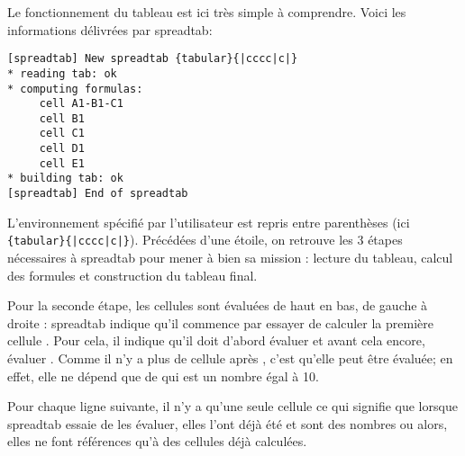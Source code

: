\documentclass[a4paper,10pt]{article}
\newcommand\verbinline[1][]{\lstinline[breaklines=false,basicstyle=\normalsize\ttfamily,#1]}
\newcommand\ST{\textsf{spreadtab}\xspace}
\newcommand\falseverb[1]{\texttt{\detokenize{#1}}}
\begin{document}
Le fonctionnement du tableau est ici très simple à comprendre. Voici les informations délivrées par \ST :\par\nobreak
\begin{lstlisting}
[spreadtab] New spreadtab {tabular}{|cccc|c|}
* reading tab: ok
* computing formulas:
     cell A1-B1-C1
     cell B1
     cell C1
     cell D1
     cell E1
* building tab: ok
[spreadtab] End of spreadtab
\end{lstlisting}
L'environnement spécifié par l'utilisateur est repris entre parenthèses (ici \verbinline-{tabular}{|cccc|c|}-). Précédées d'une étoile, on retrouve les 3 étapes nécessaires à \ST pour mener à bien sa mission : lecture du tableau, calcul des formules et construction du tableau final.

Pour la seconde étape, les cellules sont évaluées de haut en bas, de gauche à droite : \ST indique qu'il commence par essayer de calculer la première cellule \falseverb{A1}. Pour cela, il indique qu'il doit d'abord évaluer \falseverb{B1} et avant cela encore, évaluer \falseverb{C1}. Comme il n'y a plus de cellule après \falseverb{C1}, c'est qu'elle peut être évaluée; en effet, elle ne dépend que de \falseverb{D1} qui est un nombre égal à 10.

Pour chaque ligne suivante, il n'y a qu'une seule cellule ce qui signifie que lorsque \ST essaie de les évaluer, elles l'ont déjà été et sont des nombres ou alors, elles ne font références qu'à des cellules déjà calculées.
\end{document}
